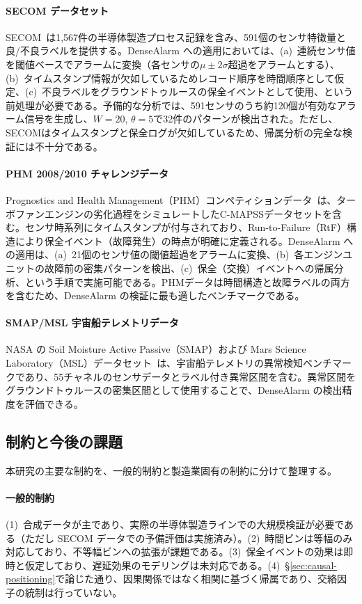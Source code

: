 \documentclass[11pt]{article}
\begin{document}
\paragraph{SECOM データセット}
SECOM~\citep{he2007secom}は1,567件の半導体製造プロセス記録を含み、591個のセンサ特徴量と良/不良ラベルを提供する。DenseAlarm への適用においては、(a)~連続センサ値を閾値ベースでアラームに変換（各センサの$\mu \pm 2\sigma$超過をアラームとする）、(b)~タイムスタンプ情報が欠如しているためレコード順序を時間順序として仮定、(c)~不良ラベルをグラウンドトゥルースの保全イベントとして使用、という前処理が必要である。予備的な分析では、591センサのうち約120個が有効なアラーム信号を生成し、$W=20$, $\theta=5$で32件のパターンが検出された。ただし、SECOMはタイムスタンプと保全ログが欠如しているため、帰属分析の完全な検証には不十分である。

\paragraph{PHM 2008/2010 チャレンジデータ}
Prognostics and Health Management（PHM）コンペティションデータ~\citep{saxena2008turbofan}は、ターボファンエンジンの劣化過程をシミュレートしたC-MAPSSデータセットを含む。センサ時系列にタイムスタンプが付与されており、Run-to-Failure（RtF）構造により保全イベント（故障発生）の時点が明確に定義される。DenseAlarm への適用は、(a)~21個のセンサ値の閾値超過をアラームに変換、(b)~各エンジンユニットの故障前の密集パターンを検出、(c)~保全（交換）イベントへの帰属分析、という手順で実施可能である。PHMデータは時間構造と故障ラベルの両方を含むため、DenseAlarm の検証に最も適したベンチマークである。

\paragraph{SMAP/MSL 宇宙船テレメトリデータ}
NASA の Soil Moisture Active Passive（SMAP）および Mars Science Laboratory（MSL）データセット~\citep{hundman2018detecting}は、宇宙船テレメトリの異常検知ベンチマークであり、55チャネルのセンサデータとラベル付き異常区間を含む。異常区間をグラウンドトゥルースの密集区間として使用することで、DenseAlarm の検出精度を評価できる。

\subsection{制約と今後の課題}

本研究の主要な制約を、一般的制約と製造業固有の制約に分けて整理する。

\paragraph{一般的制約}
(1)~合成データが主であり、実際の半導体製造ラインでの大規模検証が必要である（ただし SECOM データでの予備評価は実施済み）。(2)~時間ビンは等幅のみ対応しており、不等幅ビンへの拡張が課題である。(3)~保全イベントの効果は即時と仮定しており、遅延効果のモデリングは未対応である。(4)~\S\ref{sec:causal-positioning}で論じた通り、因果関係ではなく相関に基づく帰属であり、交絡因子の統制は行っていない。
\end{document}
